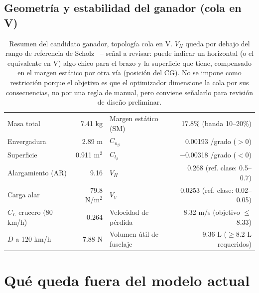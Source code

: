 \documentclass[11pt,a4paper]{article}
\begin{document}
\subsection{Geometría y estabilidad del ganador (cola en V)}

\begin{table}[h]
\centering
\small
\begin{tabular}{@{}lrlr@{}}
\toprule
Masa total & 7.41 kg & Margen estático (SM) & 17.8\% (banda 10--20\%) \\
Envergadura & 2.89 m & $C_{n_\beta}$ & 0.00193 /grado ($>0$) \\
Superficie & 0.911 m$^2$ & $C_{l_\beta}$ & $-$0.00318 /grado ($<0$) \\
Alargamiento (AR) & 9.16 & $V_H$ & 0.268 (ref. clase: 0.5--0.7) \\
Carga alar & 79.8 N/m$^2$ & $V_V$ & 0.0253 (ref. clase: 0.02--0.05) \\
$C_L$ crucero (80 km/h) & 0.264 & Velocidad de pérdida & 8.32 m/s (objetivo $\leq$8.33) \\
$D$ a 120 km/h & 7.88 N & Volumen útil de fuselaje & 9.36 L ($\geq$8.2 L requeridos) \\
\bottomrule
\end{tabular}
\caption{Resumen del candidato ganador, topología cola en V. $V_H$ queda por debajo del rango de referencia de Scholz~\cite{scholz2021} -- señal a revisar: puede indicar un horizontal (o el equivalente en V) algo chico para el brazo y la superficie que tiene, compensado en el margen estático por otra vía (posición del CG). No se impone como restricción porque el objetivo es que el optimizador dimensione la cola por sus consecuencias, no por una regla de manual, pero conviene señalarlo para revisión de diseño preliminar.}
\end{table}

\section{Qué queda fuera del modelo actual}
\end{document}
